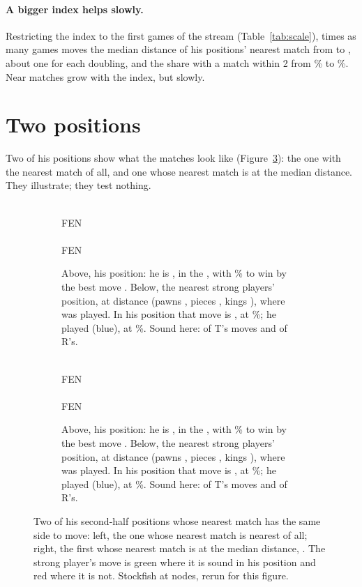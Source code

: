 \documentclass[11pt]{article}
\begin{document}
\ScaleTable

\paragraph{A bigger index helps slowly.} Restricting the index to the first games of the stream
(Table~\ref{tab:scale}), \ScaleFactor{} times as many games moves the median distance of his
positions' nearest match from \ScaleMedianFirst{} to \ScaleMedianLast, about one for each
doubling, and the share with a match within 2 from \ScaleTwoFirst\% to \ScaleTwoLast\%. Near
matches grow with the index, but slowly.

\section{Two positions}

Two of his positions show what the matches look like (Figure~\ref{fig:examples}): the one with
the nearest match of all, and one whose nearest match is at the median distance. They illustrate;
they test nothing.

\begin{figure}[ht]
\centering
\begin{subfigure}[t]{0.48\textwidth}
\centering
\EaBoard\\[0.3em]
{\footnotesize FEN \EaFen}\\[0.6em]
\EaStrongBoard\\[0.3em]
{\footnotesize FEN \EaStrongFen}
\caption{Above, his position: he is \EaMover, in the \EaPhase, with \EaWpBest\% to win by the
best move \EaBest. Below, the nearest strong players' position, at distance \EaD{} (pawns
\EaPawns, pieces \EaPieces, kings \EaKings), where \EaStrongMove{} was played. In his position
that move is \EaMove{}, \EaSound{} at \EaWpMove\%; he played \EaPlayed{} (blue), at
\EaWpPlayed\%. Sound here: \EaTSound{} of T's \Arm{} moves and \EaRSound{} of R's.}
\label{fig:nearest}
\end{subfigure}\hfill
\begin{subfigure}[t]{0.48\textwidth}
\centering
\EbBoard\\[0.3em]
{\footnotesize FEN \EbFen}\\[0.6em]
\EbStrongBoard\\[0.3em]
{\footnotesize FEN \EbStrongFen}
\caption{Above, his position: he is \EbMover, in the \EbPhase, with \EbWpBest\% to win by the
best move \EbBest. Below, the nearest strong players' position, at distance \EbD{} (pawns
\EbPawns, pieces \EbPieces, kings \EbKings), where \EbStrongMove{} was played. In his position
that move is \EbMove{}, \EbSound{} at \EbWpMove\%; he played \EbPlayed{} (blue), at
\EbWpPlayed\%. Sound here: \EbTSound{} of T's \Arm{} moves and \EbRSound{} of R's.}
\label{fig:median}
\end{subfigure}
\caption{Two of his second-half positions whose nearest match has the same side to move: left,
the one whose nearest match is nearest of all; right, the first whose nearest match is at the
median distance, \NearMedianSecond. The strong player's move is green where it is sound in his
position and red where it is not. Stockfish at \GradeNodes{} nodes, rerun for this figure.}
\label{fig:examples}
\end{figure}
\end{document}
